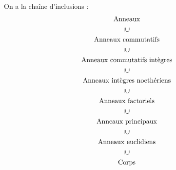 \documentclass[./main]{subfiles}
\begin{document}
  \begin{rmk}
    On a la chaîne d'inclusions :
    \begin{gather*}
      \text{Anneaux}\\
      \vertical \supseteq \\
      \text{Anneaux commutatifs} \\
      \vertical \supseteq \\
      \text{Anneaux commutatifs intègres} \\
      \vertical \supseteq \\
      \text{Anneaux intègres noethériens} \\
      \vertical \supseteq \\
      \text{Anneaux factoriels} \\
      \vertical \supseteq \\
      \text{Anneaux principaux} \\
      \vertical \supseteq \\
      \text{Anneaux euclidiens} \\
      \vertical \supseteq \\
      \text{Corps}
    \end{gather*}
  \end{rmk}
\end{document}
